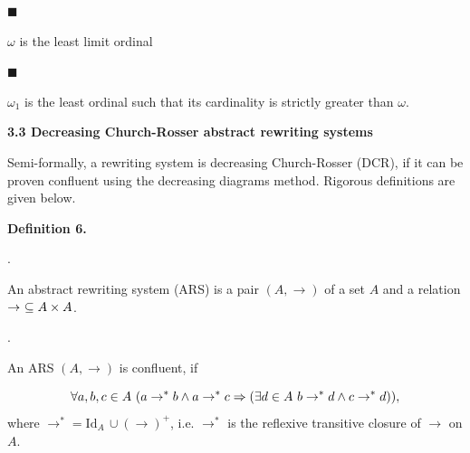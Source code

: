 \documentclass[10pt,a4paper]{amsart}
\begin{document}
\par\noindent  $\blacksquare$ 
 
$\omega$ is the least limit ordinal\par
 
 
 
\par\noindent  $\blacksquare$ 
 
$\omega_{1}$ is the least ordinal such that its cardinality is strictly greater than $\omega$.\par
 
 
  
 
 
 
\par\medskip\noindent\textbf{3.3 Decreasing Church-Rosser abstract rewriting systems}\par
 
 
Semi-formally, a rewriting system is decreasing Church-Rosser (DCR), if it can be proven confluent using the decreasing diagrams method. Rigorous definitions are given below.\par
 
 
 
\par\medskip\noindent\textbf{Definition 6.}\par
 
  
\par{}. 
 
An abstract rewriting system (ARS) is a pair $(A,\to)$ of a set $A$ and a relation $\to\leavevmode\nobreak\ \subseteq A\times A$.\par
 
 
 
\par{}. 
 
An ARS $(A,\to)$ is confluent, if\par
    \[\forall a,b,c\in A\leavevmode\nobreak\ (a\to^{*}b\wedge a\to^{*}c\Rightarrow(%
\exists d\in A\leavevmode\nobreak\ b\to^{*}d\wedge c\to^{*}d)),\]    
where $\to^{*}=\mathrm{Id}_{A}\,\cup(\to)^{+}$, i.e. $\to^{*}$ is the reflexive transitive closure of $\to$ on $A$.\par
 
\end{document}
